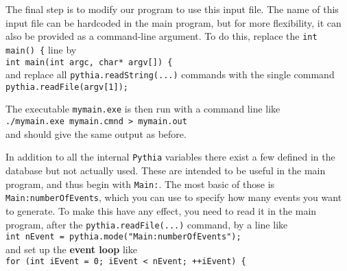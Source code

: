 \documentclass[12pt,a4paper]{article}
\begin{document}
The final step is to modify our program to use this input file. The name of
this input file can be hardcoded in the main program, but for more
flexibility, it can also be provided as a command-line argument. To do
this, replace the \texttt{int main() \{} line by \\
\hspace*{10mm} \texttt{int main(int argc, char* argv[]) \{}\\
and replace all \texttt{pythia.readString(...)} commands with the single
command\\
\hspace*{10mm}\texttt{pythia.readFile(argv[1]);} 

The executable \texttt{mymain.exe} is then run with a command line like\\
\hspace*{10mm}\texttt{./mymain.exe mymain.cmnd > mymain.out}\\
and should give the same output as before.

In addition to all the internal \texttt{Pythia} variables there exist a
few defined in the database but not actually used. These are intended to 
be useful in the main program, and thus begin with \texttt{Main:}.
The most basic of those is \texttt{Main:numberOfEvents}, which you can 
use to specify how many events you want to generate. To make this have
any effect, you need to read it in the main program, after
the \texttt{pythia.readFile(...)} command, by a line like\\
\hspace*{10mm}\texttt{int nEvent = pythia.mode("Main:numberOfEvents");}\\
and set up the \textbf{event loop} like\\
\hspace*{10mm}\texttt{for (int iEvent = 0; iEvent < nEvent; ++iEvent) \{ }
\end{document}
